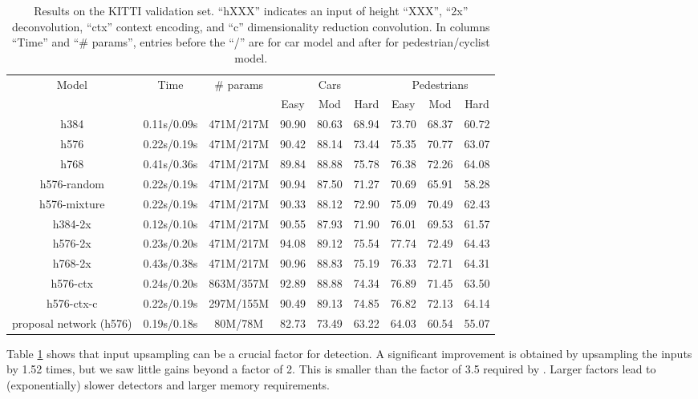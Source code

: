 \documentclass[runningheads]{llncs}
\begin{document}
\begin{table}[t]
\centering \scriptsize \setlength{\tabcolsep}{2.5pt}
\caption{Results on the KITTI validation set. ``hXXX'' indicates an input
of height ``XXX'', ``2x'' deconvolution, ``ctx'' context encoding, and ``c'' dimensionality reduction convolution.  In columns ``Time'' and ``\# params'', entries before the ``/'' are for car model and after for pedestrian/cyclist model.}
\label{tab:model comparison}
\begin{tabular}
{c||c||c||ccc|ccc}\hline\hline
\multirow{2}{*}{Model}
&\multirow{2}{*}{Time}
&\multirow{2}{*}{\# params}
&\multicolumn{3}{|c|}{Cars}
&\multicolumn{3}{|c}{Pedestrians}\\
\cline{4-9}
&\multicolumn{1}{|c||}{} &\multicolumn{1}{|c||}{} & Easy & Mod & Hard & Easy & Mod & Hard \\\hline
h384 &0.11s/0.09s &471M/217M          &90.90 &80.63 &68.94 &73.70 &68.37 &60.72\\
h576 &0.22s/0.19s &471M/217M          &90.42 &88.14 &73.44 &75.35 &70.77 &63.07\\
h768 &0.41s/0.36s &471M/217M          &89.84 &88.88 &75.78 &76.38 &72.26 &64.08\\\hline
h576-random &0.22s/0.19s &471M/217M   &90.94 &87.50 &71.27 &70.69 &65.91 &58.28\\
h576-mixture &0.22s/0.19s &471M/217M  &90.33 &88.12 &72.90 &75.09 &70.49 &62.43\\\hline
h384-2x &0.12s/0.10s &471M/217M       &90.55 &87.93 &71.90 &76.01 &69.53 &61.57\\
h576-2x &0.23s/0.20s &471M/217M       &94.08 &89.12 &75.54 &77.74 &72.49 &64.43\\
h768-2x &0.43s/0.38s &471M/217M       &90.96 &88.83 &75.19 &76.33 &72.71 &64.31\\\hline
h576-ctx &0.24s/0.20s &863M/357M      &92.89 &88.88 &74.34 &76.89 &71.45 &63.50\\
h576-ctx-c &0.22s/0.19s &297M/155M    &90.49 &89.13 &74.85 &76.82 &72.13 &64.14\\\hline
proposal network (h576) &0.19s/0.18s &80M/78M    &82.73 &73.49 &63.22 &64.03 &60.54 &55.07\\\hline
\end{tabular}
\end{table}

Table \ref{tab:model comparison} shows that input upsampling can be a crucial factor for detection. A significant improvement is obtained by upsampling the inputs by 1.52 times, but we saw little gains beyond a factor of 2. This is smaller than the factor of 3.5 required by
\cite{DBLP:conf/nips/XiaozhiNIPS15}. Larger factors lead to (exponentially)
slower detectors and larger memory requirements.
\end{document}
